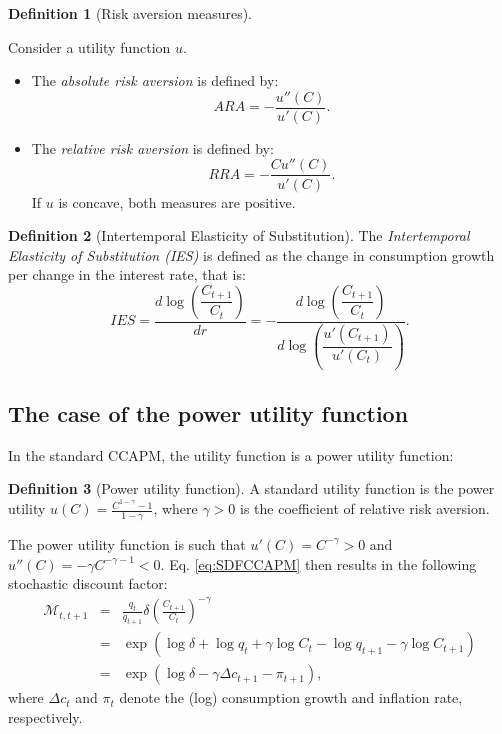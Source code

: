 \documentclass[
  12pt,
]{book}
\providecommand{\tightlist}{%
  \setlength{\itemsep}{0pt}\setlength{\parskip}{0pt}}
\theoremstyle{definition}
\newtheorem{definition}{Definition}[chapter]
\theoremstyle{definition}
\theoremstyle{definition}
\theoremstyle{definition}
\theoremstyle{remark}
\begin{document}
\begin{definition}[Risk aversion measures]
\protect\hypertarget{def:RAmeasures}{}\label{def:RAmeasures}

Consider a utility function \(u\).

\begin{itemize}
\tightlist
\item
  The \emph{absolute risk aversion} is defined by:
  \[
  ARA = - \frac{u''(C)}{u'(C)}.
  \]
\item
  The \emph{relative risk aversion} is defined by:
  \[
  RRA = - \frac{C u''(C)}{u'(C)}.
  \]
  If \(u\) is concave, both measures are positive.
\end{itemize}

\end{definition}

\begin{definition}[Intertemporal Elasticity of Substitution]
\protect\hypertarget{def:IES}{}\label{def:IES}The \emph{Intertemporal Elasticity of Substitution (IES)} is defined as the change in consumption growth per change in the interest rate, that is:
\[
IES = \frac{d \log\left( \dfrac{C_{t+1}}{C_{t}}\right)}{d r} = - \frac{d \log\left( \dfrac{C_{t+1}}{C_{t}}\right)}{d\log\left(\dfrac{u'(C_{t+1})}{u'(C_{t})}\right)}.
\]
\end{definition}

\hypertarget{the-case-of-the-power-utility-function}{%
\subsection{The case of the power utility function}\label{the-case-of-the-power-utility-function}}

In the standard CCAPM, the utility function is a power utility function:

\begin{definition}[Power utility function]
\protect\hypertarget{def:CCAPM}{}\label{def:CCAPM}A standard utility function is the power utility \(u(C) = \frac{C^{1-\gamma}-1}{1-\gamma}\), where \(\gamma>0\) is the coefficient of relative risk aversion.
\end{definition}

The power utility function is such that \(u'(C) = C^{-\gamma} > 0\) and \(u''(C) = - \gamma C^{-\gamma-1} < 0\). Eq. \eqref{eq:SDFCCAPM} then results in the following stochastic discount factor:
\begin{eqnarray}
\mathcal{M}_{t,t+1} &=&  \frac{q_t}{q_{t+1}} \delta \left(
\frac{C_{t+1}}{C_t} \right)^{-\gamma} \nonumber\\
&=& \exp(\log
\delta + \log q_t + \gamma \log  C_t - \log  q_{t+1} - \gamma
\log  C_{t+1}) \label{eq:powerutilSDF}\\
&=& \exp(\log
\delta - \gamma \Delta  c_{t+1} - \pi_{t+1}),\nonumber
\end{eqnarray}
where \(\Delta c_t\) and \(\pi_{t}\) denote the (log) consumption growth and inflation rate, respectively.
\end{document}
